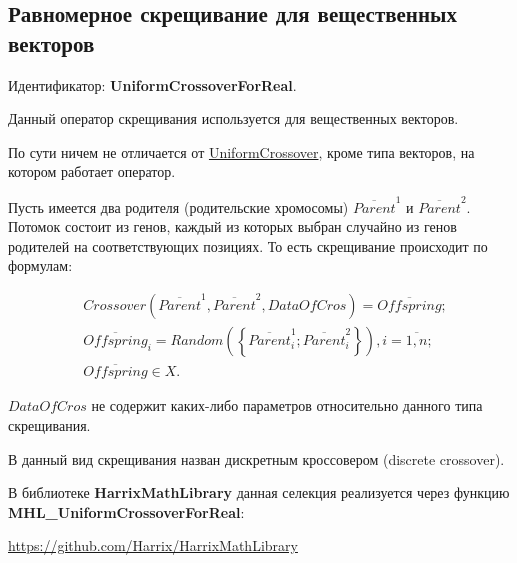\subsection{Равномерное скрещивание для вещественных векторов}\label{SetOfOperatorsAlgorithms:UniformCrossoverForReal}

Идентификатор: \textbf{UniformCrossoverForReal}.

Данный оператор скрещивания используется для вещественных векторов.

По сути ничем не отличается от \hyperref[SetOfOperatorsAlgorithms:UniformCrossover]{UniformCrossover}, кроме типа векторов, на котором работает оператор.

Пусть имеется два родителя (родительские хромосомы) $\overline{Parent}^1$ и $\overline{Parent}^2$. Потомок состоит из генов, каждый из которых выбран случайно из генов родителей на соответствующих позициях. То есть скрещивание происходит по формулам:

\begin{align}
\label{SetOfOperatorsAlgorithms:eq:UniformCrossoverForReal}
&Crossover \left( \overline{Parent}^1, \overline{Parent}^2, DataOfCros\right) = \overline{Offspring};\\
& \overline{Offspring}_i=Random\left( \left\lbrace \overline{Parent}^1_i;\overline{Parent}^2_i\right\rbrace \right), i=\overline{1,n} ;\nonumber\\
&\overline{Offspring}\in X.\nonumber
\end{align}

$ DataOfCros $ не содержит каких-либо параметров относительно данного типа скрещивания.

В \cite{web:basegroup.ru:real_coded_ga} данный вид скрещивания назван дискретным кроссовером (discrete crossover).

В библиотеке \textbf{HarrixMathLibrary} данная селекция реализуется через функцию \textbf{MHL\_UniformCrossoverForReal}:

\href{https://github.com/Harrix/HarrixMathLibrary}{https://github.com/Harrix/HarrixMathLibrary}